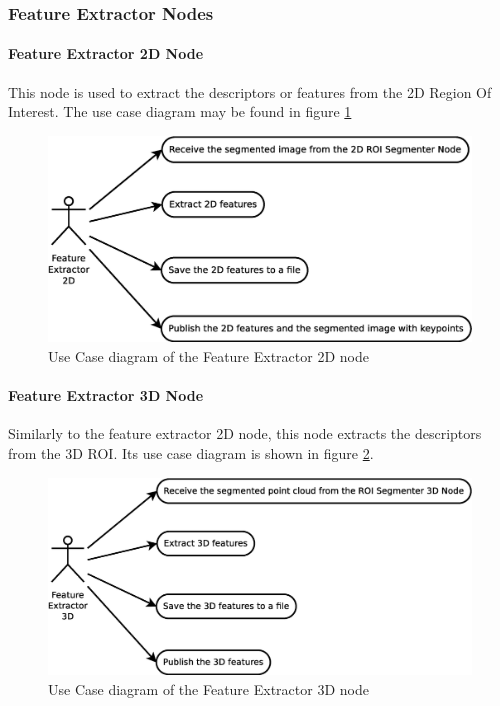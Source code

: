 \documentclass{article}
\begin{document}
\subsubsection{Feature Extractor Nodes}
\paragraph{Feature Extractor 2D Node \\[0.5cm]}
This node is used to extract the descriptors or features from the 2D Region Of Interest. 
The use case diagram may be found in figure \ref{uc_fe2d}
\begin{figure}[H]
\begin{center}
	\includegraphics[scale=0.4]{../../img/diagrams/uc_feature_extractor_2d.eps}
			\caption[Use case diagram Feature Extractor 2D node]{Use Case diagram of the Feature Extractor 2D node}
		\label{uc_fe2d}
\end{center}
\end{figure}


\paragraph{Feature Extractor 3D Node \\[0.5cm]}
Similarly to the feature extractor 2D node, this node extracts the descriptors from the 3D ROI. 
Its use case diagram is shown in figure \ref{uc_fe3d}.
\begin{figure}[H]
\begin{center}
	\includegraphics[scale=0.4]{../../img/diagrams/uc_feature_extractor_3d.eps}
			\caption[Use case diagram Feature Extractor 3D node]{Use Case diagram of the Feature Extractor 3D node}
		\label{uc_fe3d}
\end{center}
\end{figure}
\end{document}
